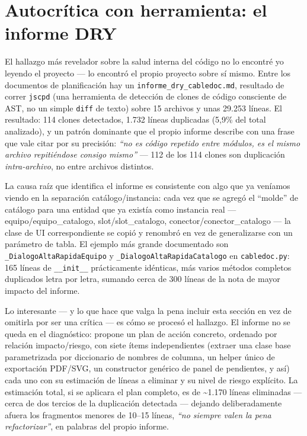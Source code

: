 \documentclass[11pt,twocolumn]{article}
\begin{document}
\section{Autocrítica con herramienta: el informe DRY}

El hallazgo más revelador sobre la salud interna del código no lo encontré yo leyendo el proyecto --- lo encontró el propio proyecto sobre sí mismo. Entre los documentos de planificación hay un \texttt{informe\_dry\_cabledoc.md}, resultado de correr \texttt{jscpd} (una herramienta de detección de clones de código consciente de AST, no un simple \texttt{diff} de texto) sobre 15 archivos y unas 29.253 líneas. El resultado: 114 clones detectados, 1.732 líneas duplicadas (5{,}9\% del total analizado), y un patrón dominante que el propio informe describe con una frase que vale citar por su precisión: \emph{``no es código repetido entre módulos, es el mismo archivo repitiéndose consigo mismo''} --- 112 de los 114 clones son duplicación \emph{intra-archivo}, no entre archivos distintos.

La causa raíz que identifica el informe es consistente con algo que ya veníamos viendo en la separación catálogo/instancia: cada vez que se agregó el ``molde'' de catálogo para una entidad que ya existía como instancia real --- equipo/equipo\_catalogo, slot/slot\_catalogo, conector/conector\_catalogo --- la clase de UI correspondiente se copió y renombró en vez de generalizarse con un parámetro de tabla. El ejemplo más grande documentado son \texttt{\_DialogoAltaRapidaEquipo} y \texttt{\_DialogoAltaRapidaCatalogo} en \texttt{cabledoc.py}: 165 líneas de \texttt{\_\_init\_\_} prácticamente idénticas, más varios métodos completos duplicados letra por letra, sumando cerca de 300 líneas de la nota de mayor impacto del informe.

Lo interesante --- y lo que hace que valga la pena incluir esta sección en vez de omitirla por ser una crítica --- es cómo se procesó el hallazgo. El informe no se queda en el diagnóstico: propone un plan de acción concreto, ordenado por relación impacto/riesgo, con siete ítems independientes (extraer una clase base parametrizada por diccionario de nombres de columna, un helper único de exportación PDF/SVG, un constructor genérico de panel de pendientes, y así) cada uno con su estimación de líneas a eliminar y su nivel de riesgo explícito. La estimación total, si se aplicara el plan completo, es de \textasciitilde1.170 líneas eliminadas --- cerca de dos tercios de la duplicación detectada --- dejando deliberadamente afuera los fragmentos menores de 10--15 líneas, \emph{``no siempre valen la pena refactorizar''}, en palabras del propio informe.
\end{document}

